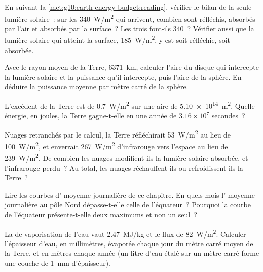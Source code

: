 \begin{exercise}[$\star\star$]\label{exo:g10:earth-energy-budget:7}
En suivant la \cref{met:g10:earth-energy-budget:reading}, vérifier le bilan
de la seule lumière solaire~: sur les \qty{340}{W/m^2} qui arrivent,
combien sont réfléchis, absorbés par l'air et absorbés par la surface~? Les
trois font-ils 340~? Vérifier aussi que la lumière solaire qui atteint la
surface, \qty{185}{W/m^2}, y est soit réfléchie, soit absorbée.
\end{exercise}

\begin{exercise}[$\star\star$]\label{exo:g10:earth-energy-budget:8}
Avec le rayon moyen de la Terre, \qty{6371}{km}, calculer l'aire du disque
qui intercepte la lumière solaire et la puissance qu'il intercepte, puis
l'aire de la sphère. En déduire la puissance moyenne par mètre carré de la
sphère.
\end{exercise}

\begin{exercise}[$\star\star$]\label{exo:g10:earth-energy-budget:9}
L'excédent de la Terre est de \qty{0.7}{W/m^2} sur une aire de
\qty{5.10e14}{m^2}. Quelle énergie, en joules, la Terre gagne-t-elle en une
année de $3.16\times10^7$ secondes~?
\end{exercise}

\begin{exercise}[$\star\star$]\label{exo:g10:earth-energy-budget:10}
Nuages retranchés par le calcul, la Terre réfléchirait \qty{53}{W/m^2} au
lieu de \qty{100}{W/m^2}, et enverrait \qty{267}{W/m^2} d'infrarouge vers
l'espace au lieu de \qty{239}{W/m^2}. De combien les nuages modifient-ils
la lumière solaire absorbée, et l'infrarouge perdu~? Au total, les nuages
réchauffent-ils ou refroidissent-ils la Terre~?
\end{exercise}

\begin{exercise}[$\star\star$]\label{exo:g10:earth-energy-budget:11}
Lire les courbes d' moyenne journalière de ce chapitre. En quels
mois l' moyenne journalière au pôle Nord dépasse-t-elle celle de
l'équateur~? Pourquoi la courbe de l'équateur présente-t-elle deux maximums
et non un seul~?
\end{exercise}

\begin{exercise}[$\star\star\star$]\label{exo:g10:earth-energy-budget:12}
La  de vaporisation de l'eau vaut \qty{2.47}{MJ/kg} et le
flux de  \qty{82}{W/m^2}. Calculer l'épaisseur d'eau, en
millimètres, évaporée chaque jour du mètre carré moyen de la Terre, et en
mètres chaque année (un litre d'eau étalé sur un mètre carré forme une
couche de \qty{1}{mm} d'épaisseur).
\end{exercise}

